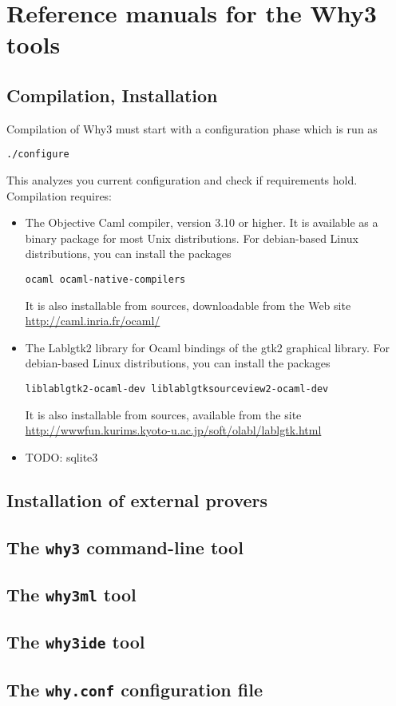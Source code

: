 \chapter{Reference manuals for the Why3 tools}

\section{Compilation, Installation}

Compilation of Why3 must start with a configuration phase which is run as
\begin{verbatim}
./configure
\end{verbatim}
This analyzes you current configuration and check if requirements hold.
Compilation requires:
\begin{itemize}
\item The Objective Caml compiler, version 3.10 or higher. It is available
as a binary package for most Unix distributions. For debian-based Linux distributions, you can install the packages
\begin{verbatim}
ocaml ocaml-native-compilers
\end{verbatim}
It is also installable from sources, downloadable from the Web site
\url{http://caml.inria.fr/ocaml/}

\item The Lablgtk2 library for Ocaml bindings of the gtk2 graphical library.
 For debian-based Linux distributions, you can install the packages
\begin{verbatim}
liblablgtk2-ocaml-dev liblablgtksourceview2-ocaml-dev
\end{verbatim}
It is also installable from sources, available from the site \url{http://wwwfun.kurims.kyoto-u.ac.jp/soft/olabl/lablgtk.html}

\item TODO: sqlite3
\end{itemize}

\section{Installation of external provers}

\section{The \texttt{why3} command-line tool}

\section{The \texttt{why3ml} tool}

\section{The \texttt{why3ide} tool}

\section{The \texttt{why.conf} configuration file}



